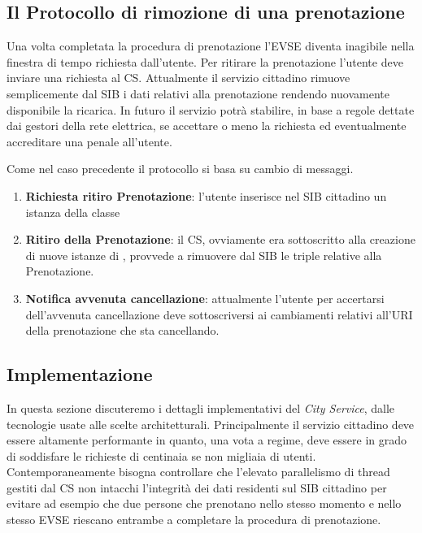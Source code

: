 \subsection{Il Protocollo di rimozione di una prenotazione}

Una volta completata la procedura di prenotazione l'EVSE diventa inagibile nella finestra di tempo richiesta dall'utente. Per ritirare la prenotazione l'utente deve inviare una richiesta al CS. Attualmente il servizio cittadino rimuove semplicemente dal SIB i dati relativi alla prenotazione rendendo nuovamente disponibile la ricarica. In futuro il servizio potrà stabilire, in base a regole dettate dai gestori della rete elettrica, se accettare o meno la richiesta ed eventualmente accreditare una penale all'utente.

Come nel caso precedente il protocollo si basa su cambio di messaggi.

\begin{enumerate}
	\item \textbf{Richiesta ritiro Prenotazione}: l'utente inserisce nel SIB cittadino un istanza della classe  
	\item \textbf{Ritiro della Prenotazione}: il CS, ovviamente era sottoscritto alla creazione di nuove istanze di , provvede a rimuovere dal SIB le triple relative alla Prenotazione.
	\item \textbf{Notifica avvenuta cancellazione}: attualmente l'utente per accertarsi dell'avvenuta cancellazione deve sottoscriversi ai cambiamenti relativi all'URI della prenotazione che sta cancellando.
\end{enumerate}

\subsection{Implementazione}\label{sec:impl}

In questa sezione discuteremo i dettagli implementativi del \emph{City Service}, dalle tecnologie usate alle scelte architetturali. Principalmente il servizio cittadino deve essere altamente performante in quanto, una vota a regime, deve essere in grado di soddisfare le richieste di centinaia se non migliaia di utenti. Contemporaneamente bisogna controllare che l'elevato parallelismo di thread gestiti dal CS non intacchi l'integrità dei dati residenti sul SIB cittadino per evitare ad esempio che due persone che prenotano nello stesso momento e nello stesso EVSE riescano entrambe a completare la procedura di prenotazione. 

